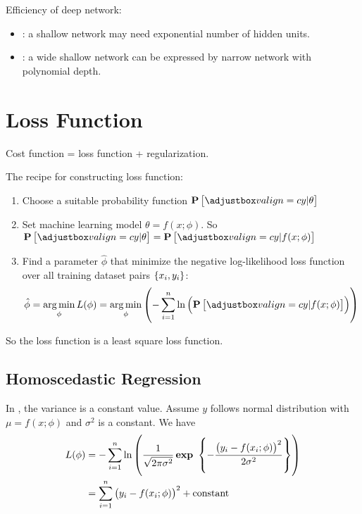 Efficiency of deep network:
\begin{itemize}
    \item {}: a shallow network may need exponential number of hidden units.
    \item {}: a wide shallow network can be expressed by narrow network with polynomial depth.
\end{itemize}



\section{Loss Function}

Cost function = loss function + regularization.

The recipe for constructing loss function:
\begin{enumerate}
    \item Choose a suitable probability function $\probability{y|\theta}$
    \item Set machine learning model $\theta = f(x;\phi)$. So $\probability{y|\theta} = \probability{y|f(x;\phi)}$
    \item Find a parameter $\hat\phi$ that minimize the negative log-likelihood loss function over all training dataset pairs $\set{x_i, y_i}$:\begin{equation}
        \hat\phi = \argmin{\phi} L(\phi) = \argmin{\phi} \left( - \sum_{i=1}^n \ln \left(\probability{y|f(x;\phi)} \right)\right)
    \end{equation}
\end{enumerate}

So the loss function is a least square loss function. 

\subsection{Homoscedastic Regression}

In , the variance is a constant value. Assume $y$ follows normal distribution with $\mu = f(x;\phi)$ and $\sigma^2$ is a constant. We have 
\begin{equation}
    \begin{aligned}
        L(\phi) &= - \sum_{i=1}^n \ln \left( \frac{1}{\sqrt{2\pi \sigma^2}} \mathop{\bf exp\/}~\set{- \frac{\left(y_i - f(x_i;\phi)\right)^2}{2 \sigma^2}} \right) \\
        &= \sum_{i=1}^n \left(y_i - f(x_i;\phi)\right)^2 + \text{constant}
    \end{aligned}
\end{equation}


